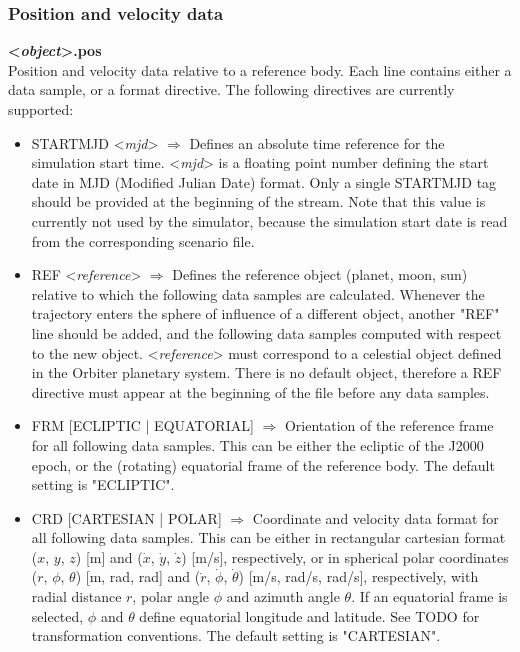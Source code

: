 \documentclass[Orbiter Technical Reference.tex]{subfiles}
\begin{document}
\subsubsection{Position and velocity data}
\textbf{<\textit{object}>.pos}\\
Position and velocity data relative to a reference body. Each line contains either a data sample, or a format directive. The following directives are currently supported:

\begin{itemize}
\item STARTMJD <\textit{mjd}> $\Rightarrow$ Defines an absolute time reference for the simulation start time. <\textit{mjd}> is a floating point number defining the start date in MJD (Modified Julian Date) format. Only a single STARTMJD tag should be provided at the beginning of the stream. Note that this value is currently not used by the simulator, because the simulation start date is read from the corresponding scenario file.
\item REF <\textit{reference}> $\Rightarrow$ Defines the reference object (planet, moon, sun) relative to which the following data samples are calculated. Whenever the trajectory enters the sphere of influence of a different object, another "REF" line should be added, and the following data samples computed with respect to the new object. <\textit{reference}> must correspond to a celestial object defined in the Orbiter planetary system. There is no default object, therefore a REF directive must appear at the beginning of the file before any data samples.
\item FRM [ECLIPTIC | EQUATORIAL] $\Rightarrow$ Orientation of the reference frame for all following data samples. This can be either the ecliptic of the J2000 epoch, or the (rotating) equatorial frame of the reference body. The default setting is "ECLIPTIC".
\item CRD [CARTESIAN | POLAR] $\Rightarrow$ Coordinate and velocity data format for all following data samples. This can be either in rectangular cartesian format ($x$, $y$, $z$) [m] and ($\dot{x}$, $\dot{y}$, $\dot{z}$) [m/s], respectively, or in spherical polar coordinates ($r$, $\phi$, $\theta$) [m, rad, rad] and ($\dot{r}$, $\dot{\phi}$, $\dot{\theta}$) [m/s, rad/s, rad/s], respectively, with radial distance $r$, polar angle $\phi$ and azimuth angle $\theta$. If an equatorial frame is selected, $\phi$ and $\theta$ define equatorial longitude and latitude. See TODO for transformation conventions. The default setting is "CARTESIAN".
\end{itemize}
\end{document}
